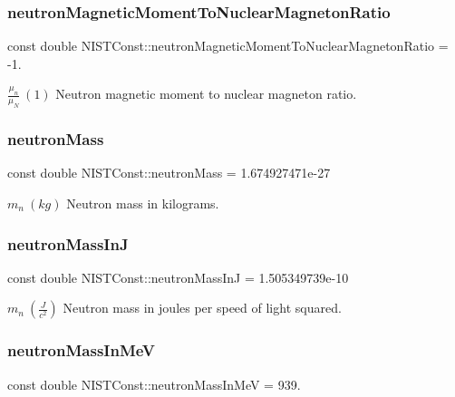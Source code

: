 \subsubsection{\texorpdfstring{neutron\+Magnetic\+Moment\+To\+Nuclear\+Magneton\+Ratio}{neutronMagneticMomentToNuclearMagnetonRatio}}
{\footnotesize\ttfamily const double N\+I\+S\+T\+Const\+::neutron\+Magnetic\+Moment\+To\+Nuclear\+Magneton\+Ratio = -\/1.}

$\frac{\mu_n}{\mu_N} \ (1)$ Neutron magnetic moment to nuclear magneton ratio. \mbox{\label{group___neutron_ga74edcc04e59f152b2afa0fdba8683383}} 
\subsubsection{\texorpdfstring{neutron\+Mass}{neutronMass}}
{\footnotesize\ttfamily const double N\+I\+S\+T\+Const\+::neutron\+Mass = 1.\+674927471e-\/27}

$m_n \ (kg)$ Neutron mass in kilograms. \mbox{\label{group___neutron_gafebac79241e20d25bca92614d60235e0}} 
\subsubsection{\texorpdfstring{neutron\+Mass\+InJ}{neutronMassInJ}}
{\footnotesize\ttfamily const double N\+I\+S\+T\+Const\+::neutron\+Mass\+InJ = 1.\+505349739e-\/10}

$m_n \ (\frac{J}{c^2})$ Neutron mass in joules per speed of light squared. \mbox{\label{group___neutron_gae6642c4b220927894fc213ad0ddf0795}} 
\subsubsection{\texorpdfstring{neutron\+Mass\+In\+MeV}{neutronMassInMeV}}
{\footnotesize\ttfamily const double N\+I\+S\+T\+Const\+::neutron\+Mass\+In\+MeV = 939.}

